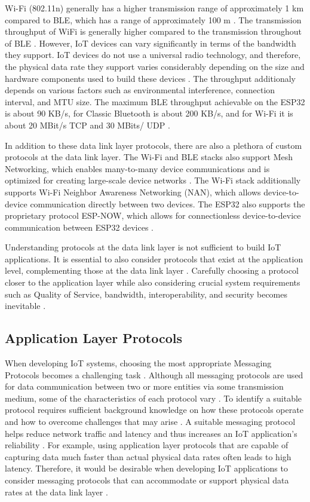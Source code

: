 Wi-Fi (802.11n) generally has a higher transmission range of approximately 1 km compared to \ac{BLE}, which has a range of approximately 100 m \cite[3]{protocols}. The transmission throughput of WiFi is generally higher compared to the transmission throughout of \ac{BLE} \cite[3]{protocols}. However, IoT devices can vary significantly in terms of the bandwidth they support. IoT devices do not use a universal radio technology, and therefore, the physical data rate they support varies considerably depending on the size and hardware components used to build these devices \cite[1-2]{protocols}. The throughput additionaly depends on various factors such as environmental interference, connection interval, and MTU size. The maximum \ac{BLE} throughput achievable on the ESP32 is about 90 KB/s, for Classic Bluetooth is about 200 KB/s, and for Wi-Fi it is about 20 MBit/s TCP and 30 MBits/ UDP \cite{esp-prog} \cite{esp-faq}.

In addition to these data link layer protocols, there are also a plethora of custom protocols at the data link layer. The Wi-Fi and \ac{BLE} stacks also support Mesh Networking, which enables many-to-many device communications and is optimized for creating large-scale device networks \cite{esp-prog}. The Wi-Fi stack additionally supports Wi-Fi Neighbor Awareness Networking (NAN), which allows device-to-device communication directly between two devices. The ESP32 also supports the proprietary protocol ESP-NOW, which allows for connectionless device-to-device communication between ESP32 devices \cite{esp-prog}. 

Understanding protocols at the data link layer is not sufficient to build IoT applications. It is essential to also consider protocols that exist at the application level, complementing those at the data link layer \cite[2]{protocols}. Carefully choosing a protocol closer to the application layer while also considering crucial system requirements such as Quality of Service, bandwidth, interoperability, and security becomes inevitable \cite[2]{protocols}.

\subsection{Application Layer Protocols}
When developing IoT systems, choosing the most appropriate
Messaging Protocols becomes a challenging task \cite[2]{protocols}. Although all messaging protocols are used for data communication between two or more entities via some transmission medium, some of the characteristics of each
protocol vary \cite[15]{protocols}. To identify a suitable protocol requires sufficient background knowledge on how these protocols operate and how to overcome challenges that may arise \cite[2, 15]{protocols}. A suitable messaging protocol helps reduce network traffic and latency and thus increases an IoT application's reliability \cite[2]{protocols}. For example, using application layer protocols that are capable of capturing data much faster than actual physical data rates often leads to high latency. Therefore, it would be desirable when developing IoT applications to consider messaging protocols that can accommodate or support physical data rates at the data link layer \cite[2]{protocols}. 

